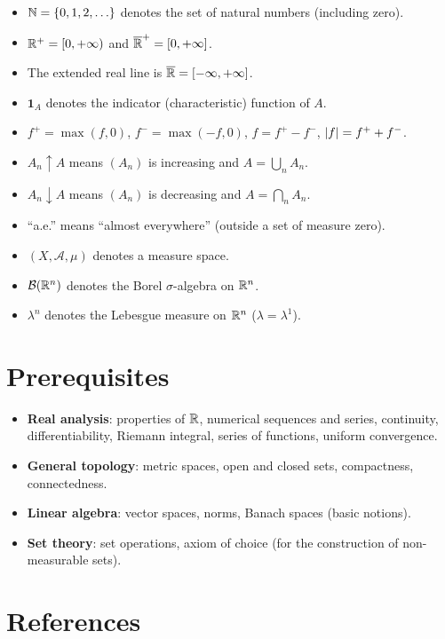 \begin{itemize}
    \item $\mathbb{N} = \{0, 1, 2, \ldots\}$ denotes the set of natural numbers (including
    zero).
    \item $\mathbb{R}^+ = [0, +\infty)$ and $\overline{\mathbb{R}}^+ = [0, +\infty]$.
    \item The extended real line is $\overline{\mathbb{R}} = [-\infty, +\infty]$.
    \item $\mathbf{1}_A$ denotes the indicator (characteristic) function of $A$.
    \item $f^+ = \max(f, 0)$, $f^- = \max(-f, 0)$, $f = f^+ - f^-$,
    $\left| f \right| = f^+ + f^-$.
    \item $A_n \uparrow A$ means $(A_n)$ is increasing and $A = \bigcup_n A_n$.
    \item $A_n \downarrow A$ means $(A_n)$ is decreasing and $A = \bigcap_n A_n$.
    \item ``a.e.'' means ``almost everywhere'' (outside a set of measure zero).
    \item $(X, \mathcal{A}, \mu)$ denotes a measure space.
    \item $\mathcal{B}(\mathbb{R}^n)$ denotes the Borel $\sigma$-algebra on $\mathbb{R}^n$.
    \item $\lambda^n$ denotes the Lebesgue measure on $\mathbb{R}^n$ ($\lambda = \lambda^1$).
\end{itemize}

\section*{Prerequisites}

\begin{itemize}
    \item \textbf{Real analysis}: properties of $\mathbb{R}$, numerical sequences and series,
    continuity, differentiability, Riemann integral, series of functions, uniform
    convergence.
    \item \textbf{General topology}: metric spaces, open and closed sets, compactness,
    connectedness.
    \item \textbf{Linear algebra}: vector spaces, norms, Banach spaces (basic notions).
    \item \textbf{Set theory}: set operations, axiom of choice (for the construction
    of non-measurable sets).
\end{itemize}

\section*{References}

